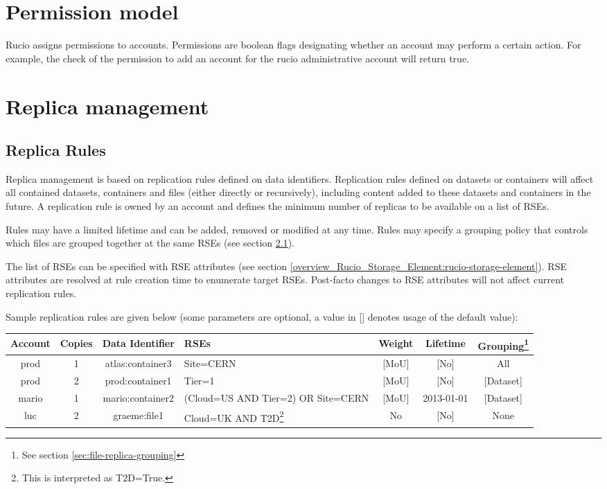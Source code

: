 \documentclass{atlasnote}
\begin{document}
\section{Permission model}
\label{overview_Permission_model:permission-model}

Rucio assigns permissions to accounts. Permissions are boolean flags designating whether an account may perform a certain action. For example, the check of the permission to add an account for the rucio administrative account will return true.

\section{Replica management}
\label{overview_Replica_management:replica-management}

\subsection{Replica Rules}
\label{sec:replica-rules}

Replica management is based on replication rules defined on data identifiers. Replication rules defined on datasets or containers will affect all contained datasets, containers and files (either directly or recursively), including content added to these datasets and containers in the future. A replication rule is owned by an account and defines the minimum number of replicas to be available on a list of RSEs.

Rules may have a limited lifetime and can be added, removed or modified at any time. Rules may specify a grouping policy that controls which files are grouped together at the same RSEs (see section \ref{sec:replica-rules}).

The list of RSEs can be specified with RSE attributes (see section \ref{overview_Rucio_Storage_Element:rucio-storage-element}). RSE attributes are resolved at rule creation time to enumerate target RSEs. Post-facto changes to RSE attributes will not affect current replication rules.

Sample replication rules are given below (some parameters are optional, a value in [] denotes usage of the default value):

\begin{minipage}{12cm}
\begin{tabular}{c c c p{2cm} c c c}
\toprule
\textbf{Account} & \textbf{Copies} & \textbf{Data Identifier} & \textbf{RSEs} & \textbf{Weight} & \textbf{Lifetime} & \textbf{Grouping\footnote{See section \ref{sec:file-replica-grouping} }} \\
\midrule
prod & 1 & atlas:container3 & Site=CERN & [MoU] & [No] & All \\
prod & 2 & prod:container1 & Tier=1 & [MoU] & [No] & [Dataset] \\
mario & 1 & mario:container2 & (Cloud=US AND Tier=2) OR Site=CERN & [MoU] & 2013-01-01 & [Dataset] \\
luc & 2 & graeme:file1 & Cloud=UK AND T2D\footnote{This is interpreted as T2D=True.} & No & [No] & None \\
\bottomrule
\end{tabular}
\end{minipage}
\end{document}

